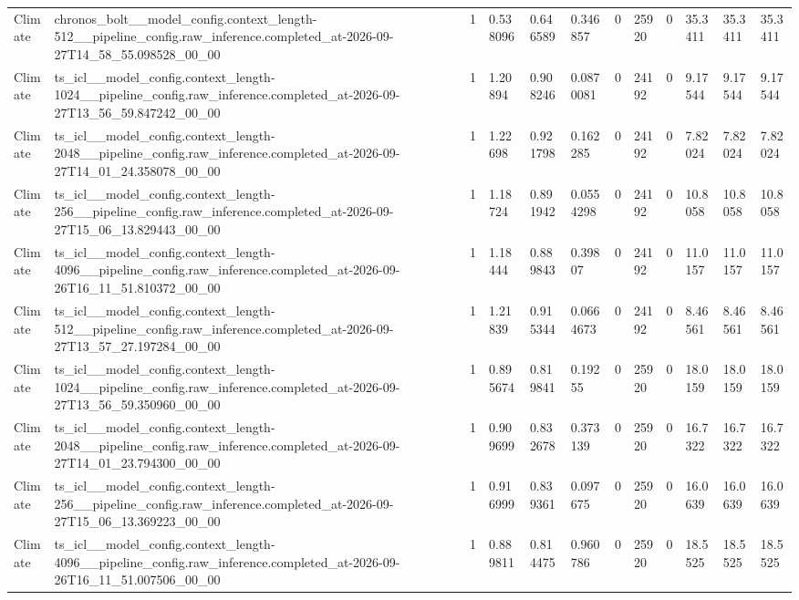 \begin{tabular}{llllllllllll}
Climate & chronos\_bolt\_\_model\_config.context\_length-512\_\_pipeline\_config.raw\_inference.completed\_at-2026-09-27T14\_58\_55.098528\_00\_00 & 1 & 0.538096 & 0.646589 & 0.346857 & 0 & 25920 & 0 & 35.3411 & 35.3411 & 35.3411 \\
Climate & ts\_icl\_\_model\_config.context\_length-1024\_\_pipeline\_config.raw\_inference.completed\_at-2026-09-27T13\_56\_59.847242\_00\_00 & 1 & 1.20894 & 0.908246 & 0.0870081 & 0 & 24192 & 0 & 9.17544 & 9.17544 & 9.17544 \\
Climate & ts\_icl\_\_model\_config.context\_length-2048\_\_pipeline\_config.raw\_inference.completed\_at-2026-09-27T14\_01\_24.358078\_00\_00 & 1 & 1.22698 & 0.921798 & 0.162285 & 0 & 24192 & 0 & 7.82024 & 7.82024 & 7.82024 \\
Climate & ts\_icl\_\_model\_config.context\_length-256\_\_pipeline\_config.raw\_inference.completed\_at-2026-09-27T15\_06\_13.829443\_00\_00 & 1 & 1.18724 & 0.891942 & 0.0554298 & 0 & 24192 & 0 & 10.8058 & 10.8058 & 10.8058 \\
Climate & ts\_icl\_\_model\_config.context\_length-4096\_\_pipeline\_config.raw\_inference.completed\_at-2026-09-26T16\_11\_51.810372\_00\_00 & 1 & 1.18444 & 0.889843 & 0.39807 & 0 & 24192 & 0 & 11.0157 & 11.0157 & 11.0157 \\
Climate & ts\_icl\_\_model\_config.context\_length-512\_\_pipeline\_config.raw\_inference.completed\_at-2026-09-27T13\_57\_27.197284\_00\_00 & 1 & 1.21839 & 0.915344 & 0.0664673 & 0 & 24192 & 0 & 8.46561 & 8.46561 & 8.46561 \\
Climate & ts\_icl\_\_model\_config.context\_length-1024\_\_pipeline\_config.raw\_inference.completed\_at-2026-09-27T13\_56\_59.350960\_00\_00 & 1 & 0.895674 & 0.819841 & 0.19255 & 0 & 25920 & 0 & 18.0159 & 18.0159 & 18.0159 \\
Climate & ts\_icl\_\_model\_config.context\_length-2048\_\_pipeline\_config.raw\_inference.completed\_at-2026-09-27T14\_01\_23.794300\_00\_00 & 1 & 0.909699 & 0.832678 & 0.373139 & 0 & 25920 & 0 & 16.7322 & 16.7322 & 16.7322 \\
Climate & ts\_icl\_\_model\_config.context\_length-256\_\_pipeline\_config.raw\_inference.completed\_at-2026-09-27T15\_06\_13.369223\_00\_00 & 1 & 0.916999 & 0.839361 & 0.097675 & 0 & 25920 & 0 & 16.0639 & 16.0639 & 16.0639 \\
Climate & ts\_icl\_\_model\_config.context\_length-4096\_\_pipeline\_config.raw\_inference.completed\_at-2026-09-26T16\_11\_51.007506\_00\_00 & 1 & 0.889811 & 0.814475 & 0.960786 & 0 & 25920 & 0 & 18.5525 & 18.5525 & 18.5525 \\

\end{tabular}

